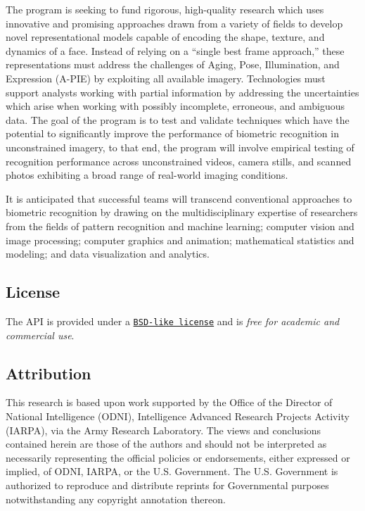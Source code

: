 The program is seeking to fund rigorous, high-\/quality research which uses innovative and promising approaches drawn from a variety of fields to develop novel representational models capable of encoding the shape, texture, and dynamics of a face. Instead of relying on a “single best frame approach,” these representations must address the challenges of Aging, Pose, Illumination, and Expression (A-\/\+P\+I\+E) by exploiting all available imagery. Technologies must support analysts working with partial information by addressing the uncertainties which arise when working with possibly incomplete, erroneous, and ambiguous data. The goal of the program is to test and validate techniques which have the potential to significantly improve the performance of biometric recognition in unconstrained imagery, to that end, the program will involve empirical testing of recognition performance across unconstrained videos, camera stills, and scanned photos exhibiting a broad range of real-\/world imaging conditions.

It is anticipated that successful teams will transcend conventional approaches to biometric recognition by drawing on the multidisciplinary expertise of researchers from the fields of pattern recognition and machine learning; computer vision and image processing; computer graphics and animation; mathematical statistics and modeling; and data visualization and analytics.\hypertarget{index_license}{}\subsection{License}\label{index_license}
The A\+P\+I is provided under a \href{LICENSE.txt}{\tt B\+S\+D-\/like license} and is {\itshape free for academic and commercial use}.\hypertarget{index_attribution}{}\subsection{Attribution}\label{index_attribution}
This research is based upon work supported by the Office of the Director of National Intelligence (O\+D\+N\+I), Intelligence Advanced Research Projects Activity (I\+A\+R\+P\+A), via the Army Research Laboratory. The views and conclusions contained herein are those of the authors and should not be interpreted as necessarily representing the official policies or endorsements, either expressed or implied, of O\+D\+N\+I, I\+A\+R\+P\+A, or the U.\+S. Government. The U.\+S. Government is authorized to reproduce and distribute reprints for Governmental purposes notwithstanding any copyright annotation thereon. 